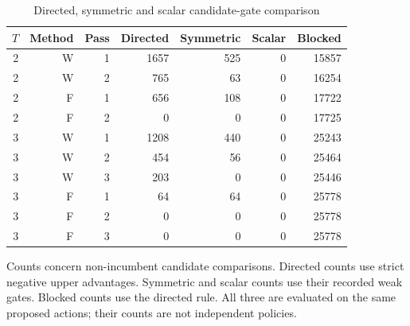 \begin{table}[htbp]
\centering
\caption{Directed, symmetric and scalar candidate-gate comparison}\label{tab:gates54}
{\small\setlength{\tabcolsep}{4pt}
\begin{tabular}{rrrrrrr}
\hline
$T$ & Method & Pass & Directed & Symmetric & Scalar & Blocked \\
\hline
2 & W & 1 & 1657 & 525 & 0 & 15857 \\
2 & W & 2 & 765 & 63 & 0 & 16254 \\
2 & F & 1 & 656 & 108 & 0 & 17722 \\
2 & F & 2 & 0 & 0 & 0 & 17725 \\
3 & W & 1 & 1208 & 440 & 0 & 25243 \\
3 & W & 2 & 454 & 56 & 0 & 25464 \\
3 & W & 3 & 203 & 0 & 0 & 25446 \\
3 & F & 1 & 64 & 64 & 0 & 25778 \\
3 & F & 2 & 0 & 0 & 0 & 25778 \\
3 & F & 3 & 0 & 0 & 0 & 25778 \\
\hline
\end{tabular}}
\par\smallskip
{\footnotesize Counts concern non-incumbent candidate comparisons. Directed counts use strict negative upper advantages. Symmetric and scalar counts use their recorded weak gates. Blocked counts use the directed rule. All three are evaluated on the same proposed actions; their counts are not independent policies.}
\end{table}
